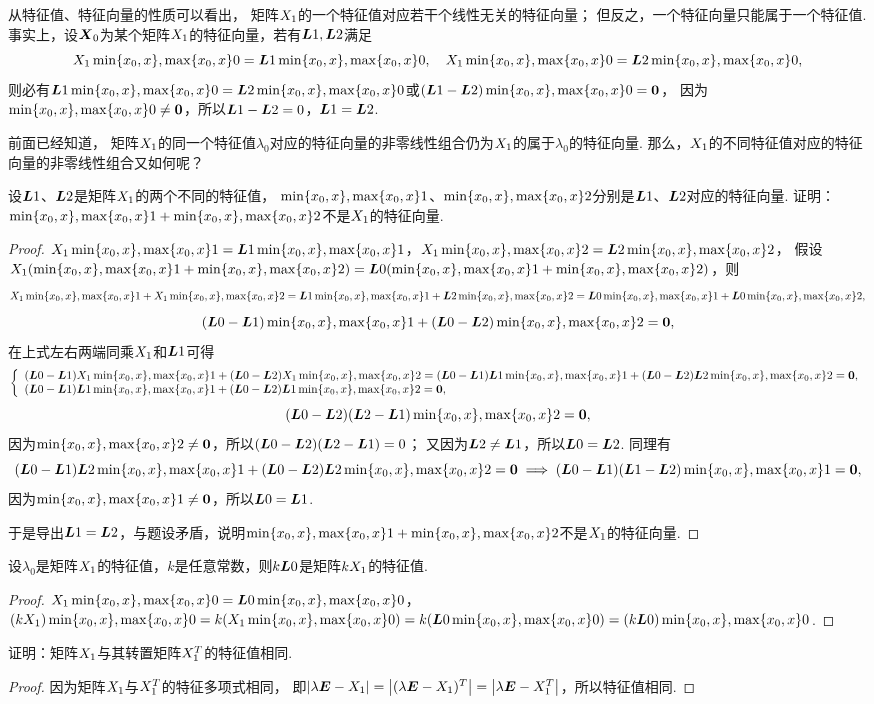 从特征值、特征向量的性质可以看出，
矩阵\(\A\)的一个特征值对应若干个线性无关的特征向量；
但反之，一个特征向量只能属于一个特征值.
事实上，设\(\x_0\)为某个矩阵\(\A\)的特征向量，若有\(\L{1},\L{2}\)满足\[
	\A\X0=\L{1}\X0,
	\quad
	\A\X0=\L{2}\X0,
\]
则必有\(\L{1}\X0=\L{2}\X0\)或\((\L{1}-\L{2})\X0=\z\)，
因为\(\X0\neq\z\)，所以\(\L{1}-\L{2}=0\)，\(\L{1}=\L{2}\).

前面已经知道，
矩阵\(\A\)的同一个特征值\(\lambda_0\)对应的特征向量的非零线性组合仍为\(\A\)的属于\(\lambda_0\)的特征向量.
那么，\(\A\)的不同特征值对应的特征向量的非零线性组合又如何呢？
\begin{example}
设\(\L{1}\)、\(\L{2}\)是矩阵\(\A\)的两个不同的特征值，
\(\X1\)、\(\X2\)分别是\(\L{1}\)、\(\L{2}\)对应的特征向量.
证明：\(\X1+\X2\)不是\(\A\)的特征向量.
\begin{proof}
\(\A\X1 = \L{1}\X1\)，\(\A\X2 = \L{2}\X2\)，
假设\(\A(\X1+\X2) = \L0(\X1+\X2)\)，则\[
	\A\X1+\A\X2 =\L{1}\X1+\L{2}\X2 = \L0\X1+\L0\X2,
\]\[
	(\L0-\L{1})\X1+(\L0-\L{2})\X2 = \z,
\]
在上式左右两端同乘\(\A\)和\(\L{1}\)可得\[
	\left\{ \begin{array}{l}
		(\L0-\L{1})\A\X1+(\L0-\L{2})\A\X2 = (\L0-\L{1})\L{1}\X1 + (\L0-\L{2})\L{2}\X2 = \z, \\
		(\L0-\L{1})\L{1}\X1+(\L0-\L{2})\L{1}\X2 = \z,
	\end{array} \right.
\]\[
	(\L0-\L{2})(\L{2}-\L{1})\X2 = \z,
\]
因为\(\X2\neq\z\)，所以\((\L0-\L{2})(\L{2}-\L{1})=0\)；
又因为\(\L{2}\neq\L{1}\)，所以\(\L0=\L{2}\).
同理有\[
	(\L0-\L{1})\L{2}\X1+(\L0-\L{2})\L{2}\X2 = \z
	\implies
	(\L0-\L{1})(\L{1}-\L{2})\X1 = \z,
\]
因为\(\X1\neq\z\)，所以\(\L0=\L{1}\).

于是导出\(\L{1}=\L{2}\)，与题设矛盾，说明\(\X1+\X2\)不是\(\A\)的特征向量.
\end{proof}
\end{example}

\begin{example}
设\(\lambda_0\)是矩阵\(\A\)的特征值，\(k\)是任意常数，则\(k\L0\)是矩阵\(k\A\)的特征值.
\begin{proof}
\(\A\X0=\L0\X0\)，\((k\A)\X0=k(\A\X0)=k(\L0\X0)=(k\L0)\X0\).
\end{proof}
\end{example}

\begin{example}
证明：矩阵\(\A\)与其转置矩阵\(\A^T\)的特征值相同.
\begin{proof}
因为矩阵\(\A\)与\(\A^T\)的特征多项式相同，
即\(\abs{\lambda\E-\A} = \abs{(\lambda\E-\A)^T} = \abs{\lambda\E-\A^T}\)，所以特征值相同.
\end{proof}
\end{example}

